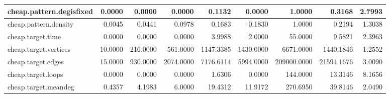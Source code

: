 \begin{table}[H]
{\begin{tabular}{|l|r|r|r|r|r|r|r|r|}
		cheap.pattern.degisfixed                & 0.0000                            & 0.0000                                & 0.0000                            & 0.1132                             & 0.0000                                & 1.0000                            & 0.3168                           & 2.7993                                   \\ \hline
		cheap.pattern.density                   & 0.0045                            & 0.0441                                & 0.0978                            & 0.1683                             & 0.1830                                & 1.0000                            & 0.2194                           & 1.3038                                   \\ \hline
		cheap.target.time                       & 0.0000                            & 0.0000                                & 0.0000                            & 3.9988                             & 2.0000                                & 55.0000                           & 9.5821                           & 2.3963                                   \\ \hline
		cheap.target.vertices                   & 10.0000                           & 216.0000                              & 561.0000                          & 1147.3385                          & 1430.0000                             & 6671.0000                         & 1440.1846                        & 1.2552                                   \\ \hline
		cheap.target.edges                      & 15.0000                           & 930.0000                              & 2074.0000                         & 7176.6114                          & 5994.0000                             & 209000.0000                       & 21594.1676                       & 3.0090                                   \\ \hline
		cheap.target.loops                      & 0.0000                            & 0.0000                                & 0.0000                            & 1.6306                             & 0.0000                                & 144.0000                          & 13.3146                          & 8.1656                                   \\ \hline
		cheap.target.meandeg                    & 0.4357                            & 4.1983                                & 6.0000                            & 19.4312                            & 11.9172                               & 270.6950                          & 39.8146                          & 2.0490                                   \\ \hline

\end{tabular}}
\end{table}
